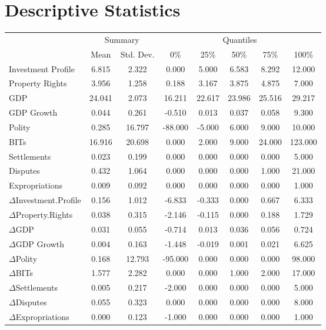 \section{Descriptive Statistics}

\begin{table}[ht]
\centering
\begin{tabular}{lcc|ccccc}
  \hline\hline
  & \multicolumn{2}{c}{Summary} & \multicolumn{5}{c}{Quantiles}\\
 & Mean & Std. Dev. & 0\% & 25\% & 50\% & 75\% & 100\% \\ 
  \hline
Investment Profile & 6.815 & 2.322 & 0.000 & 5.000 & 6.583 & 8.292 & 12.000 \\ 
  Property Rights & 3.956 & 1.258 & 0.188 & 3.167 & 3.875 & 4.875 & 7.000 \\ 
  \hline
  GDP & 24.041 & 2.073 & 16.211 & 22.617 & 23.986 & 25.516 & 29.217 \\ 
  GDP Growth & 0.044 & 0.261 & -0.510 & 0.013 & 0.037 & 0.058 & 9.300 \\ 
  Polity & 0.285 & 16.797 & -88.000 & -5.000 & 6.000 & 9.000 & 10.000 \\ 
  BITs & 16.916 & 20.698 & 0.000 & 2.000 & 9.000 & 24.000 & 123.000 \\ 
  Settlements & 0.023 & 0.199 & 0.000 & 0.000 & 0.000 & 0.000 & 5.000 \\ 
  Disputes & 0.432 & 1.064 & 0.000 & 0.000 & 0.000 & 1.000 & 21.000 \\ 
  Expropriations & 0.009 & 0.092 & 0.000 & 0.000 & 0.000 & 0.000 & 1.000 \\ 
  \hline
  $\Delta$Investment.Profile & 0.156 & 1.012 & -6.833 & -0.333 & 0.000 & 0.667 & 6.333 \\ 
  $\Delta$Property.Rights & 0.038 & 0.315 & -2.146 & -0.115 & 0.000 & 0.188 & 1.729 \\ 
  $\Delta$GDP & 0.031 & 0.055 & -0.714 & 0.013 & 0.036 & 0.056 & 0.724 \\ 
  $\Delta$GDP Growth & 0.004 & 0.163 & -1.448 & -0.019 & 0.001 & 0.021 & 6.625 \\ 
  $\Delta$Polity & 0.168 & 12.793 & -95.000 & 0.000 & 0.000 & 0.000 & 98.000 \\ 
  $\Delta$BITs & 1.577 & 2.282 & 0.000 & 0.000 & 1.000 & 2.000 & 17.000 \\ 
  $\Delta$Settlements & 0.005 & 0.217 & -2.000 & 0.000 & 0.000 & 0.000 & 5.000 \\ 
  $\Delta$Disputes & 0.055 & 0.323 & 0.000 & 0.000 & 0.000 & 0.000 & 8.000 \\
  $\Delta$Expropriations & 0.000 & 0.123 & -1.000 & 0.000 & 0.000 & 0.000 & 1.000 \\ 
   \hline\hline
\end{tabular}
\end{table}

